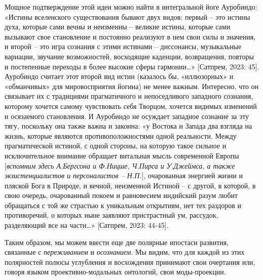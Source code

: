     Мощное подтверждение этой идеи можно найти в интегральной йоге Ауробиндо: «Истины вселенского существования бывают двух видов: первый – это истины духа, которые сами вечны и неизменны – великие истины, которые сами вызывают свое становление и постоянно реализуют в нем свои силы и значения, и второй – это игра сознания с этими истинами – диссонансы, музыкальные вариации, звучание возможностей, восходящие каденции, возвращения, повторы и постепенные переходы в более высокие сферы гармонии…»\textit{ }[Сатпрем, 2023: 45]. Ауробиндо считает этот второй вид истин (казалось бы, «иллюзорных» и «обманчивых» для мировосприятия йогина) не менее важным. Интересно, что он связывает их с традициями прагматичного и непоседливого западного сознания, которому хочется самому чувствовать себя Творцом, хочется видимых изменений и осязаемого становления. И Ауробиндо не осуждает западное сознание за эту тягу, поскольку она также важна и законна: «у Востока и Запада два взгляда на жизнь, которые являются противоположностями одной реальности. Между прагматической истиной, с одной стороны, на которую такое сильное и исключительное внимание обращает витальная мысль современной Европы [\textit{вспомним здесь А.Бергсона и Ф.Ницше, Ч.Пирса и У.Джеймса, а также экзистенциалистов и персоналистов – Н.П.}], очарованная энергией жизни и пляской Бога в Природе, и вечной, неизменной Истиной – с другой, в которой, в свою очередь, очарованный покоем и равновесием индийский разум любит обращаться с той же страстью к уникальным открытиям, нет тех раздоров и противоречий, о которых ныне заявляют пристрастный ум, рассудок, разделяющий все на части…» [Сатпрем, 2023: 44-45].

    Таким образом, мы можем ввести еще две полярные ипостаси развития, связанные с \textit{переживанием} и \textit{осознанием}. Мы видим, что для каждой из этих полярностей полюсы углубления и восхождения принимают свои очертания или, говоря языком проективно-модальных онтологий, свои моды-проекции.

